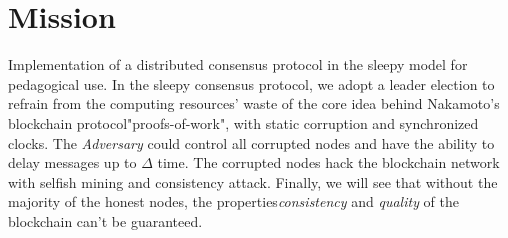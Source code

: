 \documentclass[
10pt, %
a4paper, %
oneside, %
headinclude,footinclude, %
BCOR5mm, %
]{scrartcl}
\title{\normalfont\spacedallcaps{White Paper}} %
\author{\spacedlowsmallcaps{Sleepy Consensus Simulator}} %
\date{\today} %
\begin{document}

\renewcommand{\sectionmark}[1]{\markright{\spacedlowsmallcaps{#1}}} %
\lehead{\mbox{\llap{\small\thepage\kern1em\color{halfgray} \vline}\color{halfgray}\hspace{0.5em}\rightmark\hfil}} %

\pagestyle{scrheadings} %


\maketitle %

\setcounter{tocdepth}{2} %

\tableofcontents %
\newpage


\newpage %


\section{Mission}
Implementation of a distributed consensus protocol in the sleepy model for pedagogical use. In the sleepy consensus protocol, we adopt a leader election to refrain from the computing resources' waste of the core idea behind Nakamoto's blockchain protocol\textemdash"proofs-of-work", with static corruption and synchronized clocks. The \textit{Adversary} could control all corrupted nodes and have the ability to delay messages up to $\Delta$ time. The corrupted nodes hack the blockchain network with selfish mining and consistency attack. Finally, we will see that without the majority of the honest nodes, the properties\textemdash\textit{consistency} and \textit{quality} of the blockchain can't be guaranteed.
\end{document}
